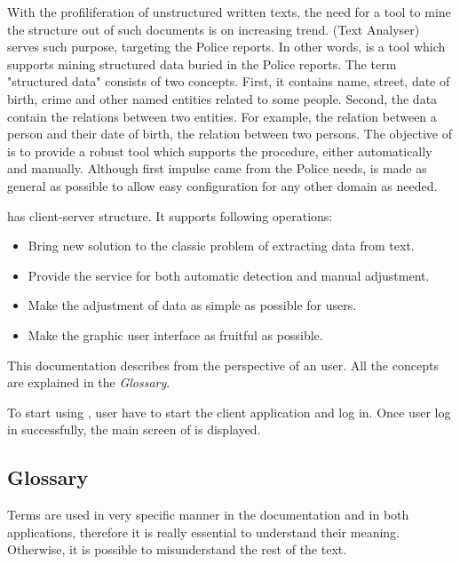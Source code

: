 With the profiliferation of unstructured written texts, the need for a tool to mine the structure out of such documents is on increasing trend. 
\textan{} (Text Analyser) serves such purpose, targeting the Police reports. 
In other words, \textan{} is a tool which supports mining structured data buried in the Police reports. The term "structured data" consists of two concepts. 
First, it contains name, street, date of birth, crime and other named entities related to some people. 
Second, the data contain the relations between two entities. 
For example, the relation between a person and their date of birth, the relation between two persons. The objective of \textan{} is to provide a robust tool which supports the procedure, either automatically and manually.
Although first impulse came from the Police needs, \textan{} is made as general
as possible to allow easy configuration for any other domain as needed.

\textan{} has client-server structure. It supports following operations:
  
  \begin{itemize}
  \item Bring new solution to the classic problem of extracting data from text.
  \item Provide the service for both automatic detection and manual adjustment.
  \item Make the adjustment of data as simple as possible for users.
  \item Make the graphic user interface as fruitful as possible.
  \end{itemize}

This documentation describes \textan{} from the perspective of an user. 
All the concepts are explained in the \emph{Glossary}.

To start using \textan{}, user have to start the client application and log in. 
Once user log in successfully, the main screen of \textan{} is displayed.


\subsection{Glossary}
Terms are used in very specific manner in the documentation and in both applications,
therefore it is really essential to understand their meaning. Otherwise, it is
possible to misunderstand the rest of the text.


